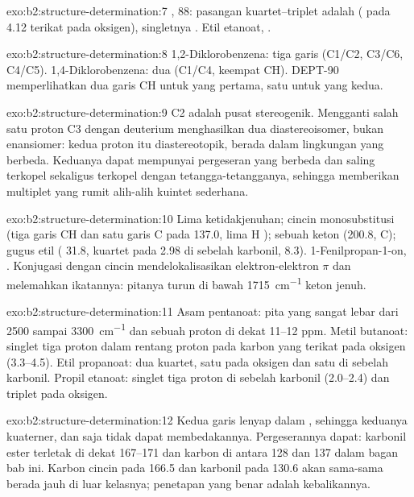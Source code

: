 \begin{solution}{exo:b2:structure-determination:7}
, 88: pasangan kuartet--triplet adalah  ( pada
4.12 terikat pada oksigen), singletnya . Etil etanoat,
.
\end{solution}

\begin{solution}{exo:b2:structure-determination:8}
1,2-Diklorobenzena: tiga garis (C1/C2, C3/C6, C4/C5). 1,4-Diklorobenzena: dua
(C1/C4, keempat CH). DEPT-90 memperlihatkan dua garis CH untuk yang pertama,
satu untuk yang kedua.
\end{solution}

\begin{solution}{exo:b2:structure-determination:9}
C2 adalah pusat stereogenik. Mengganti salah satu proton C3 dengan deuterium
menghasilkan dua diastereoisomer, bukan enansiomer: kedua proton itu
diastereotopik, berada dalam lingkungan yang berbeda. Keduanya dapat
mempunyai pergeseran yang berbeda dan saling terkopel sekaligus terkopel
dengan tetangga-tetangganya, sehingga
 memberikan multiplet yang rumit alih-alih kuintet sederhana.
\end{solution}

\begin{solution}{exo:b2:structure-determination:10}
Lima ketidakjenuhan; cincin monosubstitusi (tiga garis CH dan satu garis C
pada 137.0, lima H ); sebuah keton (200.8, C); gugus etil (
31.8, kuartet pada 2.98 di sebelah karbonil, 
8.3). 1-Fenilpropan-1-on, . Konjugasi dengan cincin
mendelokalisasikan elektron-elektron
$\pi$  dan melemahkan ikatannya: pitanya turun di bawah \qty{1715}{cm^{-1}} keton jenuh.
\end{solution}

\begin{solution}{exo:b2:structure-determination:11}
Asam pentanoat: pita  yang sangat lebar dari 2500 sampai
\qty{3300}{cm^{-1}} dan sebuah proton di dekat 11--12 ppm. Metil butanoat:
singlet tiga proton dalam rentang proton pada karbon yang terikat pada
oksigen (3.3--4.5). Etil propanoat: dua kuartet, satu pada oksigen dan satu
di sebelah karbonil. Propil etanoat: singlet tiga proton di sebelah karbonil
(2.0--2.4) dan triplet pada oksigen.
\end{solution}

\begin{solution}{exo:b2:structure-determination:12}
Kedua garis lenyap dalam , sehingga keduanya kuaterner, dan  saja
tidak dapat membedakannya. Pergeserannya dapat: karbonil ester terletak di
dekat 167--171 dan karbon  di antara 128 dan 137 dalam bagan bab
ini. Karbon cincin pada 166.5 dan karbonil pada 130.6 akan sama-sama berada
jauh di luar kelasnya; penetapan yang benar adalah kebalikannya.
\end{solution}

